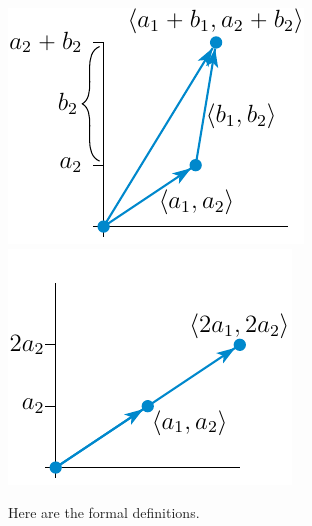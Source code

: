 \begin{efig}
  \begin{center}
  \includegraphics{maddvec.pdf}\qquad
  \includegraphics{mscalmul.pdf}
  \end{center}
\end{efig}

Here are the formal definitions.

